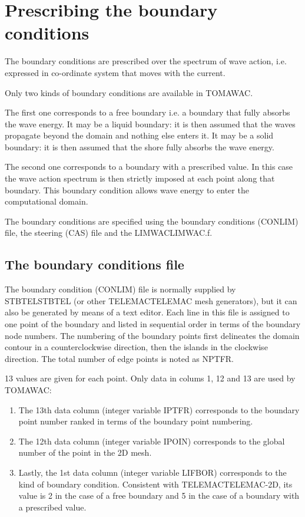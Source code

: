 \section{  Prescribing the boundary conditions}

 The boundary conditions are prescribed over the  spectrum of wave action, i.e. expressed in co-ordinate system that moves with the current.

 Only two kinds of boundary conditions are available in TOMAWAC.

 The first one corresponds to a free boundary i.e. a boundary that fully absorbs the wave energy. It may be a liquid boundary: it is then assumed that the waves propagate beyond the domain and nothing else enters it. It may be a solid boundary: it is then assumed that the shore fully absorbs the wave energy.

 The second one corresponds to a boundary with a prescribed value. In this case the wave action spectrum is then strictly imposed at each point along that boundary. This boundary condition allows wave energy to enter the computational domain.

 The boundary conditions are specified using the boundary conditions (CONLIM) file, the steering (CAS) file and the LIMWACLIMWAC.f.


\subsection{ The boundary conditions file}

 The boundary condition (CONLIM) file is normally supplied by STBTELSTBTEL (or other TELEMACTELEMAC mesh generators), but it can also be generated by means of a text editor. Each line in this file is assigned to one point of the boundary and listed in sequential order in terms of the boundary node numbers. The numbering of the boundary points first delineates the domain contour in a counterclockwise direction, then the islands in the clockwise direction. The total number of edge points is noted as NPTFR.

 13 values are given for each point. Only data in colums 1, 12 and 13 are used by TOMAWAC:

\begin{enumerate}
\item  The 13th data column (integer variable IPTFR) corresponds to the boundary point number ranked in terms of the boundary point numbering.

\item  The 12th data column (integer variable IPOIN) corresponds to the global number of the point in the 2D mesh.

\item  Lastly, the 1st data column (integer variable LIFBOR) corresponds to the kind of boundary condition. Consistent with TELEMACTELEMAC-2D, its value is 2 in the case of a free boundary and 5 in the case of a boundary with a prescribed value.
\end{enumerate}


